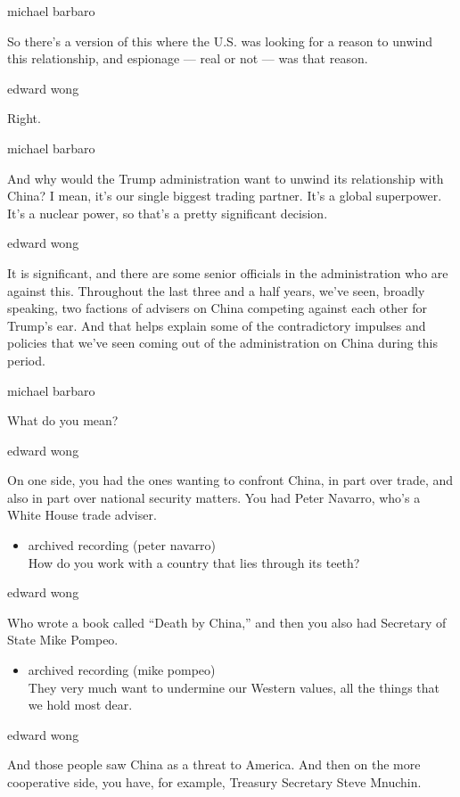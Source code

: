 michael barbaro

So there's a version of this where the U.S. was looking for a reason to
unwind this relationship, and espionage --- real or not --- was that
reason.

edward wong

Right.

michael barbaro

And why would the Trump administration want to unwind its relationship
with China? I mean, it's our single biggest trading partner. It's a
global superpower. It's a nuclear power, so that's a pretty significant
decision.

edward wong

It is significant, and there are some senior officials in the
administration who are against this. Throughout the last three and a
half years, we've seen, broadly speaking, two factions of advisers on
China competing against each other for Trump's ear. And that helps
explain some of the contradictory impulses and policies that we've seen
coming out of the administration on China during this period.

michael barbaro

What do you mean?

edward wong

On one side, you had the ones wanting to confront China, in part over
trade, and also in part over national security matters. You had Peter
Navarro, who's a White House trade adviser.

\begin{itemize}
\tightlist
\item
  archived recording (peter navarro)\\
  How do you work with a country that lies through its teeth?
\end{itemize}

edward wong

Who wrote a book called ``Death by China,'' and then you also had
Secretary of State Mike Pompeo.

\begin{itemize}
\tightlist
\item
  archived recording (mike pompeo)\\
  They very much want to undermine our Western values, all the things
  that we hold most dear.
\end{itemize}

edward wong

And those people saw China as a threat to America. And then on the more
cooperative side, you have, for example, Treasury Secretary Steve
Mnuchin.

